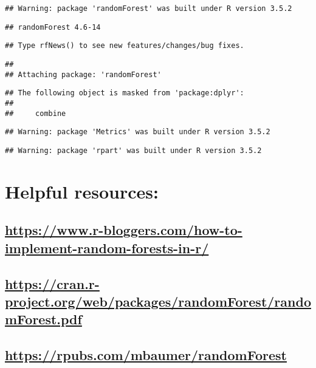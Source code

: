 \documentclass[]{article}
\begin{document}
\begin{verbatim}
## Warning: package 'randomForest' was built under R version 3.5.2
\end{verbatim}

\begin{verbatim}
## randomForest 4.6-14
\end{verbatim}

\begin{verbatim}
## Type rfNews() to see new features/changes/bug fixes.
\end{verbatim}

\begin{verbatim}
## 
## Attaching package: 'randomForest'
\end{verbatim}

\begin{verbatim}
## The following object is masked from 'package:dplyr':
## 
##     combine
\end{verbatim}

\begin{verbatim}
## Warning: package 'Metrics' was built under R version 3.5.2
\end{verbatim}

\begin{verbatim}
## Warning: package 'rpart' was built under R version 3.5.2
\end{verbatim}

\section{Helpful resources:}\label{helpful-resources}

\subsection{\texorpdfstring{\url{https://www.r-bloggers.com/how-to-implement-random-forests-in-r/}}{https://www.r-bloggers.com/how-to-implement-random-forests-in-r/}}\label{httpswww.r-bloggers.comhow-to-implement-random-forests-in-r}

\subsection{\texorpdfstring{\url{https://cran.r-project.org/web/packages/randomForest/randomForest.pdf}}{https://cran.r-project.org/web/packages/randomForest/randomForest.pdf}}\label{httpscran.r-project.orgwebpackagesrandomforestrandomforest.pdf}

\subsection{\texorpdfstring{\url{https://rpubs.com/mbaumer/randomForest}}{https://rpubs.com/mbaumer/randomForest}}\label{httpsrpubs.commbaumerrandomforest}
\end{document}
